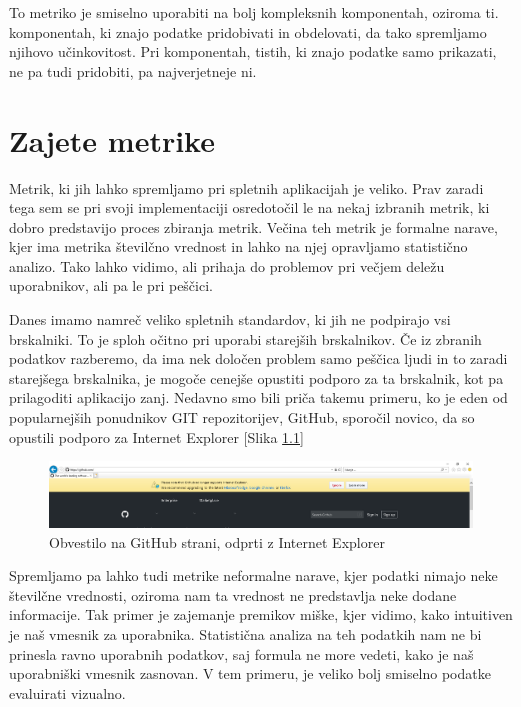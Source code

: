 \documentclass[a4paper, 12pt]{book}
\begin{document}
To metriko je smiselno uporabiti na bolj kompleksnih komponentah, oziroma ti.  komponentah, ki znajo podatke pridobivati in obdelovati, da tako spremljamo njihovo učinkovitost. Pri  komponentah, tistih, ki znajo podatke samo prikazati, ne pa tudi pridobiti, pa najverjetneje ni.

\chapter{Zajete metrike}
\label{ch2}

Metrik, ki jih lahko spremljamo pri spletnih aplikacijah je veliko. Prav zaradi tega sem se pri svoji implementaciji osredotočil le na nekaj izbranih metrik, ki dobro predstavijo proces zbiranja metrik. Večina teh metrik je formalne narave, kjer ima metrika številčno vrednost in lahko na njej opravljamo statistično analizo. Tako lahko vidimo, ali prihaja do problemov pri večjem deležu uporabnikov, ali pa le pri peščici.

Danes imamo namreč veliko spletnih standardov, ki jih ne podpirajo vsi brskalniki. To je sploh očitno pri uporabi starejših brskalnikov. Če iz zbranih podatkov razberemo, da ima nek določen problem samo peščica ljudi in to zaradi starejšega brskalnika, je mogoče cenejše opustiti podporo za ta brskalnik, kot pa prilagoditi aplikacijo zanj. Nedavno smo bili priča takemu primeru, ko je eden od popularnejših ponudnikov GIT repozitorijev, GitHub, sporočil novico, da so opustili podporo za Internet Explorer [Slika \ref{img:github_ie}]

\begin{figure}[h]
	\begin{center}
		\includegraphics[width=1\textwidth]{github_end_support.png}
	\end{center}
	\caption{Obvestilo na GitHub strani, odprti z Internet Explorer}
	\label{img:github_ie}
\end{figure}

Spremljamo pa lahko tudi metrike neformalne narave, kjer podatki nimajo neke številčne vrednosti, oziroma nam ta vrednost ne predstavlja neke dodane informacije. Tak primer je zajemanje premikov miške, kjer vidimo, kako intuitiven je naš vmesnik za uporabnika. Statistična analiza na teh podatkih nam ne bi prinesla ravno uporabnih podatkov, saj formula ne more vedeti, kako je naš uporabniški vmesnik zasnovan. V tem primeru, je veliko bolj smiselno podatke evaluirati vizualno.
\end{document}
